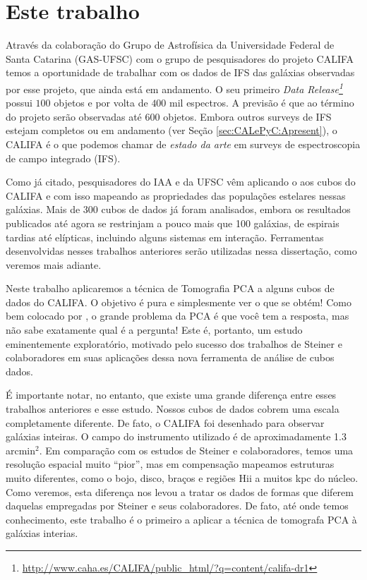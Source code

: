 \section{Este trabalho}
\label{sec:Intro:ThisWork}

Através da colaboração do Grupo de Astrofísica da Universidade Federal de Santa Catarina (GAS-UFSC) com o grupo de
pesquisadores do projeto CALIFA temos a oportunidade de trabalhar com os dados de IFS das galáxias observadas por esse
projeto, que ainda está em andamento. O seu primeiro {\em Data
Release\footnote{\url{http://www.caha.es/CALIFA/public_html/?q=content/califa-dr1}}} \citep[][DR1]{Husemann2013} possui
$100$ objetos e por volta de $400$ mil espectros. A previsão é que ao término do projeto serão observadas até $600$
objetos. Embora outros surveys de IFS estejam completos ou em andamento (ver Seção \ref{sec:CALePyC:Apresent}), o CALIFA
é o que podemos chamar de {\em estado da arte} em surveys de espectroscopia de campo integrado (IFS).

Como já citado, pesquisadores do IAA e da UFSC vêm aplicando o \starlight aos cubos do CALIFA e com isso mapeando as
propriedades das populações estelares nessas galáxias. Mais de 300 cubos de dados já foram analisados, embora os
resultados publicados até agora se restrinjam a pouco mais que 100 galáxias, de espirais tardias até elípticas,
incluindo alguns sistemas em interação. Ferramentas desenvolvidas nesses trabalhos anteriores serão utilizadas nessa
dissertação, como veremos mais adiante.

Neste trabalho aplicaremos a técnica de Tomografia PCA a alguns cubos de dados do CALIFA. O objetivo é pura e
simplesmente ver o que se obtém! Como bem colocado por \citet{Steiner2009}, o grande problema da PCA é que você tem a
resposta, mas não sabe exatamente qual é a pergunta! Este é, portanto, um estudo eminentemente exploratório, motivado
pelo sucesso dos trabalhos de Steiner e colaboradores em suas aplicações dessa nova ferramenta de análise de cubos
dados.

É importante notar, no entanto, que existe uma grande diferença entre esses trabalhos anteriores e esse estudo.  Nossos
cubos de dados cobrem uma escala completamente diferente. De fato, o CALIFA foi desenhado para observar galáxias
inteiras. O campo do instrumento utilizado é de aproximadamente 1.3 arcmin$^2$. Em comparação com os estudos de Steiner
e colaboradores, temos uma resolução espacial muito ``pior'', mas em compensação mapeamos estruturas muito diferentes,
como o bojo, disco, braços e regiões H{\sc ii} a muitos kpc do núcleo. Como veremos, esta diferença nos levou a tratar
os dados de formas que diferem daquelas empregadas por Steiner e seus colaboradores. De fato, até onde temos conhecimento,
este trabalho é o primeiro a aplicar a técnica de tomografa PCA à galáxias interias.

